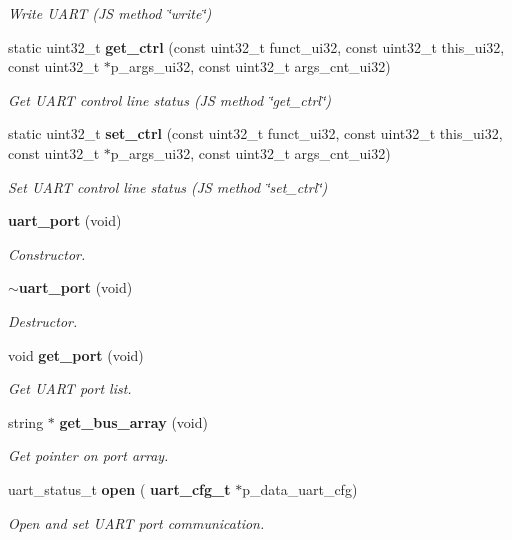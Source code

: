\begin{DoxyCompactItemize}
\begin{DoxyCompactList}\small\item\em Write U\+A\+RT (JS method \char`\"{}write\char`\"{}) \end{DoxyCompactList}\item 
static uint32\+\_\+t \textbf{ get\+\_\+ctrl} (const uint32\+\_\+t funct\+\_\+ui32, const uint32\+\_\+t this\+\_\+ui32, const uint32\+\_\+t $\ast$p\+\_\+args\+\_\+ui32, const uint32\+\_\+t args\+\_\+cnt\+\_\+ui32)
\begin{DoxyCompactList}\small\item\em Get U\+A\+RT control line status (JS method \char`\"{}get\+\_\+ctrl\char`\"{}) \end{DoxyCompactList}\item 
static uint32\+\_\+t \textbf{ set\+\_\+ctrl} (const uint32\+\_\+t funct\+\_\+ui32, const uint32\+\_\+t this\+\_\+ui32, const uint32\+\_\+t $\ast$p\+\_\+args\+\_\+ui32, const uint32\+\_\+t args\+\_\+cnt\+\_\+ui32)
\begin{DoxyCompactList}\small\item\em Set U\+A\+RT control line status (JS method \char`\"{}set\+\_\+ctrl\char`\"{}) \end{DoxyCompactList}\item 
\textbf{ uart\+\_\+port} (void)
\begin{DoxyCompactList}\small\item\em Constructor. \end{DoxyCompactList}\item 
\textbf{ $\sim$uart\+\_\+port} (void)
\begin{DoxyCompactList}\small\item\em Destructor. \end{DoxyCompactList}\item 
void \textbf{ get\+\_\+port} (void)
\begin{DoxyCompactList}\small\item\em Get U\+A\+RT port list. \end{DoxyCompactList}\item 
string $\ast$ \textbf{ get\+\_\+bus\+\_\+array} (void)
\begin{DoxyCompactList}\small\item\em Get pointer on port array. \end{DoxyCompactList}\item 
uart\+\_\+status\+\_\+t \textbf{ open} (\textbf{ uart\+\_\+cfg\+\_\+t} $\ast$p\+\_\+data\+\_\+uart\+\_\+cfg)
\begin{DoxyCompactList}\small\item\em Open and set U\+A\+RT port communication. \end{DoxyCompactList}\item 

\end{DoxyCompactItemize}
